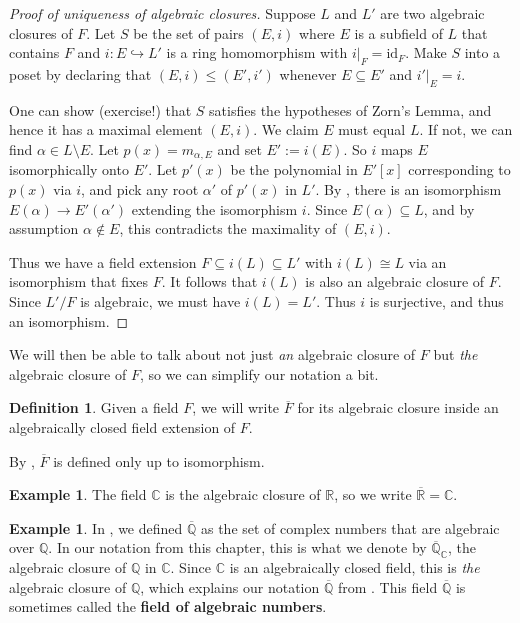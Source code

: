 \documentclass[12pt]{report}
\numberwithin{equation}{section}
\numberwithin{theorem}{chapter}
\theoremstyle{definition}
\newtheorem{definition}[theorem]{Definition}
\newtheorem{example}[theorem]{Example}
\newtheorem*{basic properties}{Basic Properties}
\newtheorem*{Important Remark}{Important Remark}
\newcommand{\df}[1]{{\bf #1}\index{#1}}
\newcommand{\C}{\mathbb{C}}
\begin{document}
\begin{proof}[Proof of uniqueness of algebraic closures]
Suppose $L$ and $L'$ are two algebraic closures of $F$.
Let $S$ be the set of pairs $(E,i)$ where $E$ is a subfield of $L$ that contains $F$ and $i: E \hookrightarrow L'$ is a ring homomorphism with $i|_F = \mathrm{id}_F$. Make $S$ into a poset by declaring that $(E,i) \leq (E',i')$ whenever $E \subseteq E'$ and $i'|_E = i$.

One can show (exercise!) that $S$ satisfies the hypotheses of Zorn's Lemma, and hence it has a maximal element $(E,i)$. We claim $E$ must equal $L$. If not, we can find $\alpha \in L \setminus E$. Let $p(x) = m_{\alpha, E}$ and set $E' := i(E)$. So $i$ maps $E$ isomorphically onto $E'$.
Let $p'(x)$ be the polynomial in $E'[x]$ corresponding to $p(x)$ via $i$, and pick any root $\alpha'$ of $p'(x)$ in $L'$.
By , there is an isomorphism $E(\alpha) \to E'(\alpha')$
extending the isomorphism $i$. Since $E(\alpha) \subseteq L$, and by assumption $\alpha \notin E$, this contradicts the maximality of $(E, i)$.

Thus we have a field extension $F \subseteq i(L) \subseteq L'$ with $i(L) \cong L$ via an isomorphism that fixes $F$. It follows that $i(L)$ is also an algebraic closure of $F$. Since $L'/F$ is algebraic, we must have $i(L) = L'$. Thus $i$ is surjective, and thus an isomorphism.
\end{proof}


We will then be able to talk about not just \emph{an} algebraic closure of $F$ but \emph{the} algebraic closure of $F$, so we can simplify our notation a bit.


\begin{definition}
	Given a field $F$, we will write $\overline{F}$ for its algebraic closure inside an algebraically closed field extension of $F$.
\end{definition}


By , $\overline{F}$ is defined only up to isomorphism.


\begin{example}
	The field $\C$ is the algebraic closure of $\mathbb{R}$, so we write $\overline{\mathbb{R}} = \C$.
\end{example}


\begin{example}
	In , we defined $\overline{\mathbb{Q}}$ as the set of complex numbers that are algebraic over $\mathbb{Q}$. In our notation from this chapter, this is what we denote by $\overline{\mathbb{Q}}_\C$, the algebraic closure of $\mathbb{Q}$ in $\C$. Since $\C$ is an algebraically closed field, this is \emph{the} algebraic closure of $\mathbb{Q}$, which explains our notation $\overline{\mathbb{Q}}$ from . This field $\overline{\mathbb{Q}}$ is sometimes called the \df{field of algebraic numbers}.
\end{example}
\end{document}
